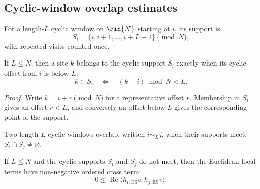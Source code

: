\subsection{Cyclic-window overlap estimates}\label{subsec:spectral_gap_cyclic_overlap}

\begin{definition}
    \label{def:cyclic_window_support}
    \leanok
    For a length-$L$ cyclic window on $\Fin{N}$ starting at $i$, its support is
    \[
        S_i=\{i,i+1,\ldots,i+L-1\}\pmod N,
    \]
    with repeated visits counted once.
\end{definition}

\begin{lemma}
    \label{lem:cyclic_window_support_offsets}
    \leanok
    If $L\le N$, then a site $k$ belongs to the cyclic support $S_i$ exactly when
    its cyclic offset from $i$ is below $L$:
    \[
        k\in S_i
        \quad\Longleftrightarrow\quad
        (k-i)\bmod N < L.
    \]
\end{lemma}

\begin{proof}
    \leanok
    Write $k=i+r\pmod N$ for a representative offset $r$. Membership in
    $S_i$ gives an offset $r<L$, and conversely an offset below $L$ gives the
    corresponding point of the support.
\end{proof}

\begin{definition}
    \label{def:cyclic_windows_overlap}
    \leanok
    Two length-$L$ cyclic windows overlap, written $i\sim_L j$, when their
    supports meet: $S_i\cap S_j\ne\varnothing$.
\end{definition}

\begin{lemma}
    \label{lem:cyclic_window_nonoverlap_positive}
    \leanok
    If $L\le N$ and the cyclic supports $S_i$ and $S_j$ do not meet, then the
    Euclidean local terms have non-negative ordered cross term:
    \[
        0\le\operatorname{Re}\langle h_{i,\mathrm{ES}}v,
        h_{j,\mathrm{ES}}v\rangle.
    \]
\end{lemma}

